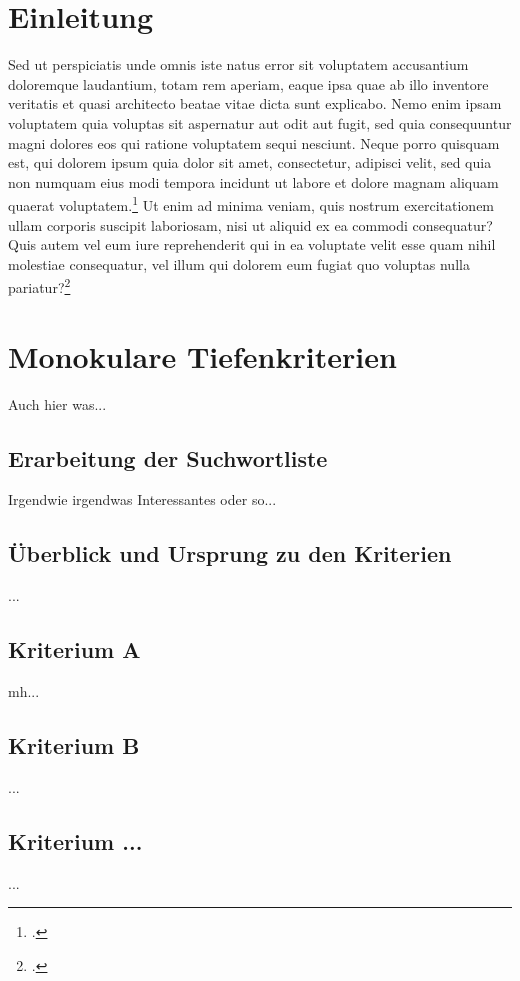 \section{Einleitung}
Sed ut perspiciatis unde omnis iste natus error sit voluptatem accusantium doloremque laudantium, totam rem aperiam, eaque ipsa quae ab illo inventore veritatis et quasi architecto beatae vitae dicta sunt explicabo. Nemo enim ipsam voluptatem quia voluptas sit aspernatur aut odit aut fugit, sed quia consequuntur magni dolores eos qui ratione voluptatem sequi nesciunt. Neque porro quisquam est, qui dolorem ipsum quia dolor sit amet, consectetur, adipisci velit, sed quia non numquam eius modi tempora incidunt ut labore et dolore magnam aliquam quaerat voluptatem.\footcite[Vgl.][]{testOnline} Ut enim ad minima veniam, quis nostrum exercitationem ullam corporis suscipit laboriosam, nisi ut aliquid ex ea commodi consequatur? Quis autem vel eum iure reprehenderit qui in ea voluptate velit esse quam nihil molestiae consequatur, vel illum qui dolorem eum fugiat quo voluptas nulla pariatur?\footcite[Vgl.][S. 83]{testBuch}

\section{Monokulare Tiefenkriterien}
Auch hier was...

\subsection{Erarbeitung der Suchwortliste}
Irgendwie irgendwas Interessantes oder so...

\subsection{Überblick und Ursprung zu den Kriterien}
...

\subsection{Kriterium A}
mh...

\subsection{Kriterium B}
...

\subsection{Kriterium ...}
...

